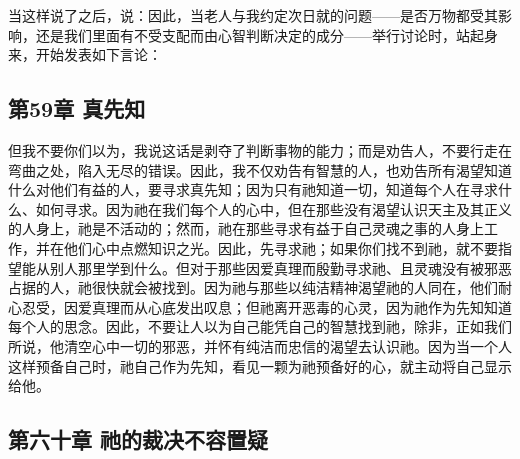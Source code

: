当这样说了之后，说：因此，当老人与我约定次日就的问题——是否万物都受其影响，还是我们里面有不受支配而由心智判断决定的成分——举行讨论时，站起身来，开始发表如下言论：\par


\subsection{第59章 真先知}

但我不要你们以为，我说这话是剥夺了判断事物的能力；而是劝告人，不要行走在弯曲之处，陷入无尽的错误。因此，我不仅劝告有智慧的人，也劝告所有渴望知道什么对他们有益的人，要寻求真先知；因为只有祂知道一切，知道每个人在寻求什么、如何寻求。因为祂在我们每个人的心中，但在那些没有渴望认识天主及其正义的人身上，祂是不活动的；然而，祂在那些寻求有益于自己灵魂之事的人身上工作，并在他们心中点燃知识之光。因此，先寻求祂；如果你们找不到祂，就不要指望能从别人那里学到什么。但对于那些因爱真理而殷勤寻求祂、且灵魂没有被邪恶占据的人，祂很快就会被找到。因为祂与那些以纯洁精神渴望祂的人同在，他们耐心忍受，因爱真理而从心底发出叹息；但祂离开恶毒的心灵，因为祂作为先知知道每个人的思念。因此，不要让人以为自己能凭自己的智慧找到祂，除非，正如我们所说，他清空心中一切的邪恶，并怀有纯洁而忠信的渴望去认识祂。因为当一个人这样预备自己时，祂自己作为先知，看见一颗为祂预备好的心，就主动将自己显示给他。\par


\subsection{第六十章 祂的裁决不容置疑}

